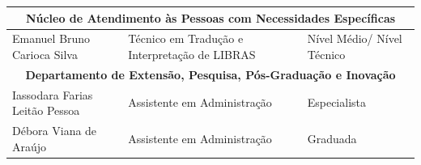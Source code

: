 \begin{longtable}{|p{6cm}|p{5.5cm}|p{2.3cm}|}
	\multicolumn{3}{|c|}{\textbf{Núcleo de Atendimento às Pessoas com Necessidades Específicas}} \\
	\hline
	Emanuel Bruno Carioca Silva & Técnico em Tradução e Interpretação de LIBRAS & Nível Médio/ Nível Técnico  \\ \hline
	
	\multicolumn{3}{|c|}{\textbf{Departamento de Extensão, Pesquisa, Pós-Graduação e Inovação}} \\
	\hline
	Iassodara Farias Leitão Pessoa & Assistente em Administração & Especialista \\ \hline
	Débora Viana de Araújo & Assistente em Administração & Graduada \\ \hline
\end{longtable}
